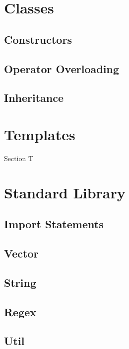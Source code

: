 \documentclass{article}
\begin{document}

\section{Classes}
  \subsection{Constructors}
  \subsection{Operator Overloading}
  \subsection{Inheritance}

\section{Templates}
  Section T

\section{Standard Library}
  \subsection{Import Statements}
  \subsection{Vector}
  \subsection{String}
  \subsection{Regex}
  \subsection{Util}
\end{document}
